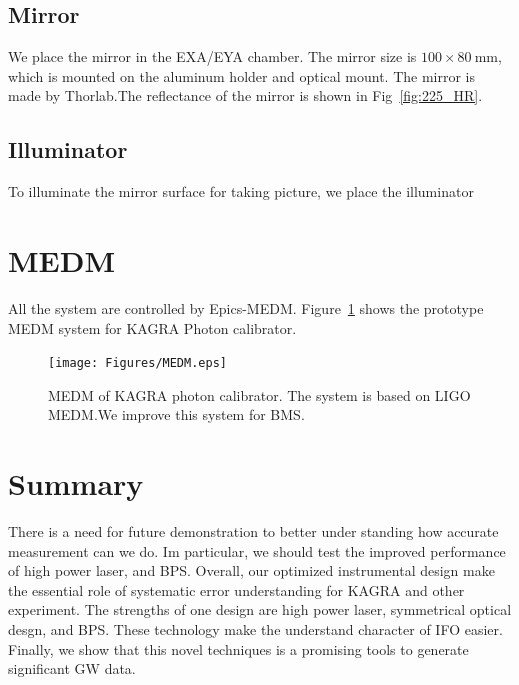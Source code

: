 \subsection{Mirror}
We place the mirror in the EXA/EYA chamber. The mirror size is $100 \times 80~\mathrm{mm}$, which is mounted on the aluminum holder and optical mount. The mirror is made by Thorlab.The reflectance of the mirror is shown in Fig~\ref{fig:225_HR}.
\subsection{Illuminator}
To illuminate the mirror surface for taking picture, we place the illuminator

\section{MEDM}
All the system are controlled by Epics-MEDM. Figure~\ref{fig:MEDM} shows the prototype MEDM system for KAGRA Photon calibrator.
\begin{figure}
\begin{center}
\texttt{[image: Figures/MEDM.eps]}
\caption{MEDM of KAGRA photon calibrator. The system is based on LIGO MEDM.We improve this system for BMS.}
\label{fig:MEDM} 
\end{center}
\end{figure}

\section{Summary}
There is a need for future demonstration to better under standing how accurate measurement can we do.
Im particular, we should test the improved performance of high power laser, and  BPS.
Overall, our optimized instrumental design make the essential role of systematic error understanding for KAGRA and other experiment.
The strengths of one design are high power laser, symmetrical optical desgn, and BPS.
These technology make the understand character of IFO easier.
Finally, we show that this novel techniques is a promising tools to generate significant GW data.
